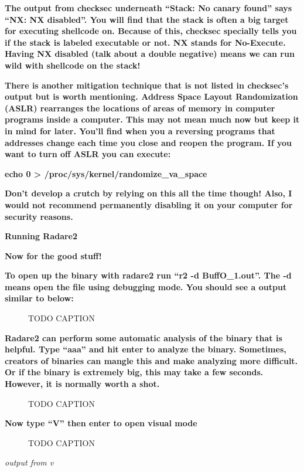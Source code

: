 \documentclass[letterpaper]{article}
\newcommand{\sitfig}[3]{
\begin{figure}[H]
\centering
\makebox[\textwidth][c]{
#2
}
\caption{#3}
\label{#1}
\end{figure}
}
\newcommand{\sitgfx}[4][scale=1.0]{
\sitfig{#3}{\texttt{[image: \#2]}}{#4}
}
\begin{document}
\textbf{The output from checksec underneath ``Stack: No canary found'' says ``NX: NX disabled''. You will find that the
stack is often a big target for executing shellcode on. Because of this, checksec specially tells you if the stack is
labeled executable or not. NX stands for No-Execute. Having NX disabled (talk about a double negative) means we can run
wild with shellcode on the stack!}

\textbf{There is another mitigation technique that is not listed in checksec's output but is worth mentioning. Address
Space Layout Randomization (ASLR) rearranges the locations of areas of memory in computer programs inside a computer.
This may not mean much now but keep it in mind for later. You'll find when you a reversing programs that addresses
change each time you close and reopen the program. If you want to turn off ASLR you can execute:}

\textbf{echo 0 {\textgreater} /proc/sys/kernel/randomize\_va\_space}

\textbf{Don't develop a crutch by relying on this all the time though! Also, I would not recommend permanently disabling
it on your computer for security reasons.}

{\centering
\textbf{Running Radare2}
\par}

\textbf{Now for the good stuff!}

\textbf{To open up the binary with radare2 run ``r2 -d BuffO\_1.out''. The -d means open the file using debugging mode.
You should see a output similar to below:}

  
\sitgfx[width=5.8335in,height=3.6457in]{FINALWORKINGDOCFORMERLYPRECURSOR-img084.png}{fig:unk}{TODO CAPTION}
 

\textbf{Radare2 can perform some automatic analysis of the binary that is helpful. Type ``aaa'' and hit enter to analyze
the binary. Sometimes, creators of binaries can mangle this and make analyzing more difficult. Or if the binary is
extremely big, this may take a few seconds. However, it is normally worth a shot.}

  
\sitgfx[width=5.8335in,height=3.6457in]{FINALWORKINGDOCFORMERLYPRECURSOR-img075.png}{fig:unk}{TODO CAPTION}
 

\textbf{Now type ``V'' then enter to open visual mode}

  
\sitgfx[width=5.8335in,height=3.6457in]{FINALWORKINGDOCFORMERLYPRECURSOR-img076.png}{fig:unk}{TODO CAPTION}
 

\textit{output from v}
\end{document}
